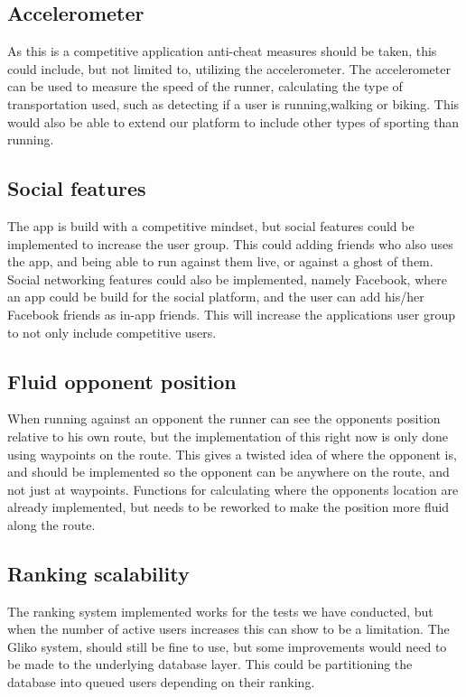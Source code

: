 \subsection{Accelerometer}
As this is a competitive application anti-cheat measures should be taken, this could include, but not limited to, utilizing the accelerometer. The accelerometer can be used to measure the speed of the runner, calculating the type of transportation used, such as detecting if a user is running,walking or biking. This would also be able to extend our platform to include other types of sporting than running.

\subsection{Social features}
The app is build with a competitive mindset, but social features could be implemented to increase the user group.
This could adding friends who also uses the app, and being able to run against them live, or against a ghost of them.
Social networking features could also be implemented, namely Facebook, where an app could be build for the social platform, and the user can add his/her Facebook friends as in-app friends.
This will increase the applications user group to not only include competitive users.

\subsection{Fluid opponent position}
When running against an opponent the runner can see the opponents position relative to his own route, but the implementation of this right now is only done using waypoints on the route. This gives a twisted idea of where the opponent is, and should be implemented so the opponent can be anywhere on the route, and not just at waypoints. Functions for calculating where the opponents location are already implemented, but needs to be reworked to make the position more fluid along the route.

\subsection{Ranking scalability}
The ranking system implemented works for the tests we have conducted, but when the number of active users increases this can show to be a limitation. The Gliko system, should still be fine to use, but some improvements would need to be made to the underlying database layer. This could be partitioning the database into queued users depending on their ranking.
